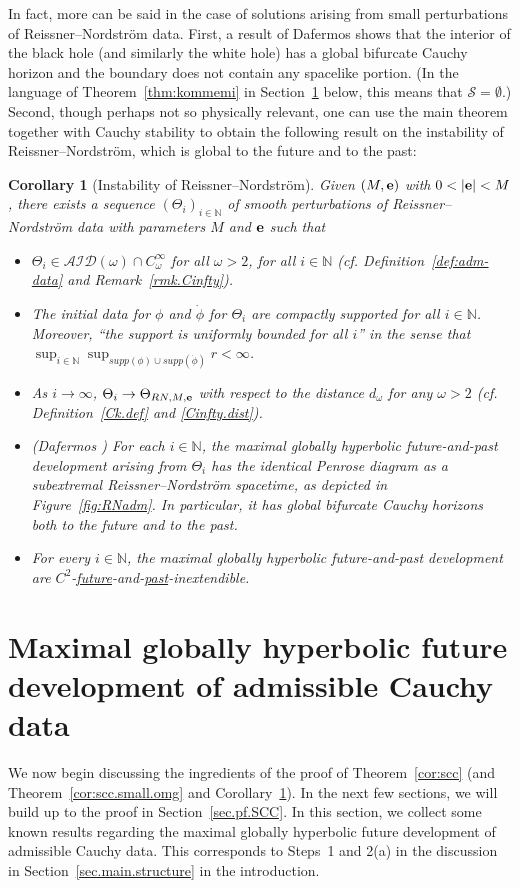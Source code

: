 \documentclass[10pt, reqno]{amsart}
\newtheorem{corollary}[theorem]{Corollary}
\theoremstyle{definition}
\theoremstyle{remark}
\numberwithin{equation}{section}
\newcommand{\0}{\emptyset}
\newcommand{\Tht}{\Theta}
\newcommand{\omg}{\omega}
\newcommand{\bfe}{{\bf e}}
\newcommand{\bbN}{\mathbb N}
\newcommand{\calA}{\mathcal A}
\newcommand{\calD}{\mathcal D}
\newcommand{\calI}{\mathcal I}
\newcommand{\e}{\bfe}							%
\begin{document}
In fact, more can be said in the case of solutions arising from small perturbations of Reissner--Nordstr\"om data. First, a result of Dafermos \cite{D3} shows that the interior of the black hole (and similarly the white hole) has a global bifurcate Cauchy horizon and the boundary does not contain any spacelike portion. (In the language of Theorem~\ref{thm:kommemi} in Section~\ref{sec:mghd} below, this means that $\mathcal S=\emptyset$.) Second, though perhaps not so physically relevant, one can use the main theorem together with Cauchy stability to obtain the following result on the instability of Reissner--Nordstr\"om, which is global to the future and to the past:


\begin{corollary}[Instability of Reissner--Nordstr\"om]\label{cor:RN.instab}
Given $(M, \e)$ with $0<|\e|<M$, there exists a sequence $(\Tht_i)_{i\in \mathbb N}$ of smooth perturbations of Reissner--Nordstr\"om data with parameters $M$ and $\e$ such that
\begin{itemize}
\item $\Tht_i\in \calA \calI \calD (\omg)\cap C^\infty_{\omg}$ for all $\omg > 2$, for all $i\in \mathbb N$ (cf. Definition~\ref{def:adm-data} and Remark~\ref{rmk.Cinfty}).
\item The initial data for $\phi$ and $\dot{\phi}$ for $\Tht_i$ are compactly supported for all $i\in \mathbb N$. Moreover, ``the support is uniformly bounded for all $i$'' in the sense that $\displaystyle\sup_{i\in \mathbb N}\sup_{supp (\phi)\cup supp(\dot{\phi})} r<\infty$.
\item As $i\to \infty$, $\Tht_i\to \Tht_{RN, M, \e}$ with respect to the distance $d_{\omg}$ for any $\omg > 2$ (cf. Definition~\ref{Ck.def} and \eqref{Cinfty.dist}). 
\item (Dafermos \cite{D3}) For each $i \in \bbN$, the maximal globally hyperbolic future-and-past development arising from $\Tht_i$ has the identical Penrose diagram as a subextremal Reissner--Nordstr\"om spacetime, as depicted in Figure~\ref{fig:RNadm}. In particular, it has global bifurcate Cauchy horizons both to the future and to the past.
\item For every $i\in \mathbb N$, the maximal globally hyperbolic future-and-past development are $C^2$-\underline{future}-and-\underline{past}-inextendible.
\end{itemize}
\end{corollary}


\section{Maximal globally hyperbolic future development of admissible Cauchy data} \label{sec:mghd}
We now begin discussing the ingredients of the proof of Theorem~\ref{cor:scc} (and Theorem~\ref{cor:scc.small.omg} and Corollary~\ref{cor:RN.instab}). In the next few sections, we will build up to the proof in Section~\ref{sec.pf.SCC}. In this section, we collect some known results regarding the maximal globally hyperbolic future development of admissible Cauchy data. This corresponds to Steps~1 and 2(a) in the discussion in Section~\ref{sec.main.structure} in the introduction.
\end{document}
